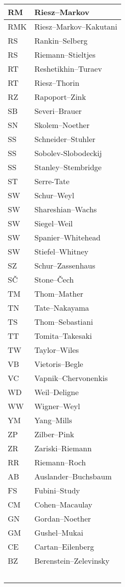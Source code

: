 \documentclass{amsart}
\numberwithin{equation}{section}
\theoremstyle{plain}
\numberwithin{equation}{section}
\theoremstyle{remark}
\begin{document}
\begin{multicols}{2}
{\begin{longtable}{l|l}
RM & Riesz--Markov\\ \hline
RMK & Riesz--Markov--Kakutani\\ \hline
RS & Rankin--Selberg\\ \hline
RS & Riemann--Stieltjes\\ \hline
RT & Reshetikhin--Turaev\\ \hline
RT & Riesz--Thorin\\ \hline
RZ & Rapoport--Zink\\ \hline
SB & Severi--Brauer\\ \hline
SN & Skolem--Noether\\ \hline
SS & Schneider--Stuhler\\ \hline
SS & Sobolev-Slobodeckij\\ \hline
SS & Stanley--Stembridge\\ \hline
ST & Serre-Tate\\ \hline
SW & Schur--Weyl\\ \hline
SW & Shareshian--Wachs\\ \hline
SW & Siegel--Weil\\ \hline
SW & Spanier--Whitehead\\ \hline
SW & Stiefel--Whitney\\ \hline
SZ & Schur--Zassenhaus\\ \hline
SČ & Stone--Čech\\ \hline
TM & Thom--Mather\\ \hline
TN & Tate--Nakayama\\ \hline
TS & Thom--Sebastiani\\ \hline
TT & Tomita--Takesaki\\ \hline
TW & Taylor--Wiles\\ \hline
VB & Vietoris--Begle\\ \hline
VC & Vapnik--Chervonenkis\\ \hline
WD & Weil--Deligne\\ \hline
WW & Wigner--Weyl\\ \hline
YM & Yang--Mills\\ \hline
ZP & Zilber--Pink\\ \hline
ZR & Zariski--Riemann\\ \hline
RR & Riemann--Roch\\ \hline
AB & Auslander--Buchsbaum\\ \hline
FS & Fubini--Study\\ \hline
CM & Cohen--Macaulay\\ \hline
GN & Gordan--Noether\\ \hline
GM & Gushel--Mukai\\ \hline
CE & Cartan--Eilenberg\\ \hline
BZ & Berenstein--Zelevinsky\\ \hline
 & \\ \hline
 & \\ \hline
 & \\ \hline
 & \\ \hline
 & \\ \hline
\end{longtable}
\unskip
\unpenalty
\unpenalty}


\end{multicols}
\end{document}
